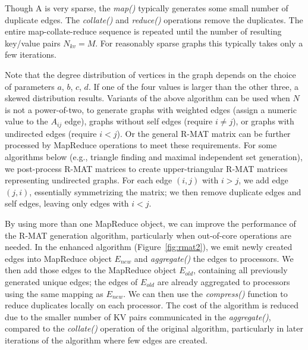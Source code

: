 Though A is very sparse, the {\it map()} typically generates some
small number of duplicate edges.  The {\it collate()} and {\it
reduce()} operations remove the duplicates.  The entire
map-collate-reduce sequence is repeated until the number of resulting
key/value pairs $N_{kv} = M$.  For reasonably sparse graphs this
typically takes only a few iterations.

Note that the degree distribution of vertices in the graph depends on
the choice of parameters $a$, $b$, $c$, $d$.  If one of the four
values is larger than the other three, a skewed distribution results.
Variants of the above algorithm can be used when $N$ is not a
power-of-two, to generate graphs with weighted edges (assign a numeric
value to the $A_{ij}$ edge), graphs without self edges (require $i \ne
j$), or graphs with undirected edges (require $i < j$).  Or the
general R-MAT matrix can be further processed by MapReduce operations
to meet these requirements.  For some algorithms below (e.g., triangle
finding and maximal independent set generation), we post-process R-MAT
matrices to create upper-triangular R-MAT matrices representing
undirected graphs.  For each edge $(i,j)$ with $i>j$, we add edge
$(j,i)$, essentially symmetrizing the matrix; we then remove duplicate
edges and self edges, leaving only edges with $i<j$.

By using more than one MapReduce object, we can improve the
performance of the R-MAT generation algorithm, particularly when
out-of-core operations are needed.  In the enhanced algorithm
(Figure~\ref{fig:rmat2}), we emit newly created edges into MapReduce
object $E_{new}$ and {\it aggregate()} the edges to processors.  We
then add those edges to the MapReduce object $E_{old}$, containing all
previously generated unique edges; the edges of $E_{old}$ are already
aggregated to processors using the same mapping as $E_{new}$.  We can
then use the {\it compress()} function to reduce duplicates locally on
each processor.  The cost of the algorithm is reduced due to the
smaller number of KV pairs communicated in the {\it aggregate()},
compared to the {\it collate()} operation of the original algorithm,
particularly in later iterations of the algorithm where few edges are
created.

